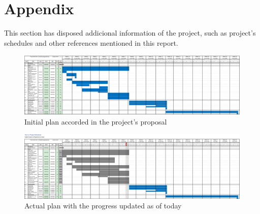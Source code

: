 %
%

\chapter{Appendix}

This section has disposed addicional information of the project, such as project's 
schedules and other references mentioned in this report.


\begin{landscape}
    \begin{figure}
        \centering 
        \includegraphics[scale=0.3]{_figures/Project_initial_plan.eps}
        \caption{Initial plan accorded in the project's proposal}
    \end{figure}  
\end{landscape}

\begin{landscape}
    \begin{figure}
        \centering 
        \includegraphics[scale=0.3]{_figures/Project_actual_plan.eps}
        \caption{Actual plan with the progress updated as of today}
    \end{figure}  
\end{landscape}

\begin{landscape}    
    
\end{landscape}

